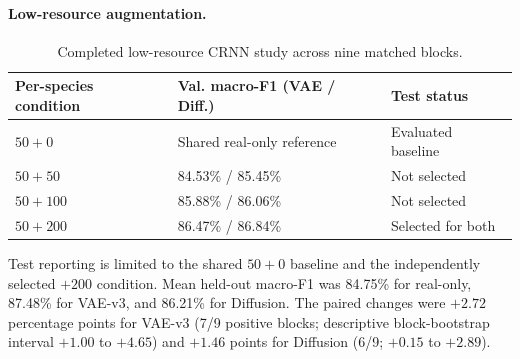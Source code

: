\documentclass{article}
\begin{document}
\begin{table}[t]
  \caption{Frozen selected-CRNN and feature-space generated-sample diagnostics.}
  \label{tab:quality}
  \centering
  \small
\end{table}

\paragraph{Low-resource augmentation.}
\begin{table}[t]
  \caption{Completed low-resource CRNN study across nine matched blocks.}
  \label{tab:low-resource}
  \centering
  \small
  \begin{tabular}{@{}lll@{}}
    \toprule
    Per-species condition & Val. macro-F1 (VAE / Diff.) & Test status \\
    \midrule
    $50+0$ & Shared real-only reference & Evaluated baseline \\
    $50+50$ & 84.53\% / 85.45\% & Not selected \\
    $50+100$ & 85.88\% / 86.06\% & Not selected \\
    $50+200$ & 86.47\% / 86.84\% & Selected for both \\
    \bottomrule
  \end{tabular}
\end{table}

Test reporting is limited to the shared $50+0$ baseline and the independently
selected $+200$ condition. Mean held-out macro-F1 was 84.75\% for real-only,
87.48\% for VAE-v3, and 86.21\% for Diffusion. The paired changes were
$+2.72$ percentage points for VAE-v3 (7/9 positive blocks; descriptive
block-bootstrap interval $+1.00$ to $+4.65$) and $+1.46$ points for Diffusion
(6/9; $+0.15$ to $+2.89$).
\end{document}
